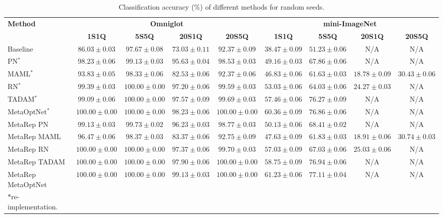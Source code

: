 \begin{table}[htbp]
  \caption{Classification accuracy (\%) of different methods for random seeds.}
  \centering
  \begin{adjustbox}{width=1.0\linewidth,center}
  \fontsize{9}{9}\selectfont
  \begin{tabular}{p{3cm}cccc|cccc}
  \toprule
  \multirow{2}{*}{\bf Method} & \multicolumn{4}{c|}{\bf Omniglot} & \multicolumn{4}{c}{\bf mini-ImageNet} \\
  & {\bf 1S1Q} & {\bf 5S5Q} & {\bf 20S1Q} & {\bf 20S5Q} & {\bf 1S1Q} & {\bf 5S5Q} & {\bf 20S1Q} & {\bf 20S5Q} \\
  \midrule
  Baseline & $86.03 \pm 0.03$ & $97.67 \pm 0.08$ & $73.03 \pm 0.11$ & $92.37 \pm 0.09$ & $38.47 \pm 0.09$ & $51.23 \pm 0.06$ & N/A & N/A \\
  PN$^{*}$ & $98.23 \pm 0.06$ & $99.13 \pm 0.03$ & $95.63 \pm 0.04$ & $98.53 \pm 0.03$ & $49.16 \pm 0.03$ & $67.86 \pm 0.06$ & N/A & N/A \\
  MAML$^{*}$ & $93.83 \pm 0.05$ & $98.33 \pm 0.06$ & $82.53 \pm 0.06$ & $92.37 \pm 0.06$ & $46.83 \pm 0.06$ & $61.63 \pm 0.03$ & $18.78 \pm 0.09$ & $30.43 \pm 0.06$ \\
  RN$^{*}$ & $99.39 \pm 0.03$ & $100.00 \pm 0.00$ & $97.20 \pm 0.06$ & $99.59 \pm 0.03$ & $53.03 \pm 0.06$ & $64.03 \pm 0.06$ & $24.27 \pm 0.03$ & N/A \\
  TADAM$^{*}$ & $99.09 \pm 0.06$ & $100.00 \pm 0.00$ & $97.57 \pm 0.09$ & $99.69 \pm 0.03$ & $57.46 \pm 0.06$ & $76.27 \pm 0.09$ & N/A & N/A \\
  MetaOptNet$^{*}$ & $100.00 \pm 0.00$ & $100.00 \pm 0.00$ & $98.23 \pm 0.06$ & $100.00 \pm 0.00$ & $60.36 \pm 0.09$ & $76.86 \pm 0.06$ & N/A & N/A \\
  \midrule

  MetaRep PN & $99.13 \pm 0.03$ & $99.73 \pm 0.02$ & $96.23 \pm 0.03$ & $98.77 \pm 0.03$ & $50.13 \pm 0.06$ & $68.41 \pm 0.02$ & N/A & N/A \\
  MetaRep MAML & $96.47 \pm 0.06$ & $98.37 \pm 0.03$ & $83.37 \pm 0.06$ & $92.75 \pm 0.09$ & $47.63 \pm 0.09$ & $61.83 \pm 0.03$ & $18.91 \pm 0.06$ & $30.74 \pm 0.03$ \\
  MetaRep RN & $100.00 \pm 0.00$ & $100.00 \pm 0.00$ & $97.37 \pm 0.06$ & $99.70 \pm 0.03$ & $57.03 \pm 0.09$ & $67.03 \pm 0.06$ & $25.03 \pm 0.06$ & N/A \\
  MetaRep TADAM & $100.00 \pm 0.00$ & $100.00 \pm 0.00$ & $97.90 \pm 0.06$ & $100.00 \pm 0.00$ & $58.75 \pm 0.09$ & $76.94 \pm 0.06$ & N/A & N/A \\
  MetaRep MetaOptNet & $100.00 \pm 0.00$ & $100.00 \pm 0.00$ & $99.13 \pm 0.03$ & $100.00 \pm 0.00$ & $61.23 \pm 0.06$ & $77.11 \pm 0.04$ & N/A & N/A \\
  \bottomrule
  $*$re-implementation.
  \end{tabular}
  \end{adjustbox}
  \label{tab:accuracy_omni_mini}
\end{table}


